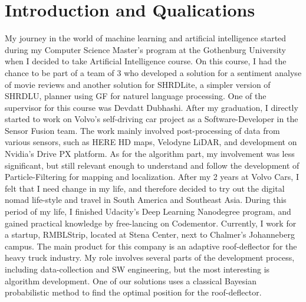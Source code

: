 \documentclass[12pt]{article}
\begin{document}
\maketitle

\begin{abstract}

\end{abstract}

\section*{Introduction and Qualications}
My journey in the world of machine learning and artificial intelligence started during my Computer Science Master's program at the Gothenburg University when I decided to take Artificial Intelligence course. On this course, I had the chance to be part of a team of 3 who developed a solution for a sentiment analyse of movie reviews and another solution for SHRDLite, a simpler version of SHRDLU\cite{win1970shrdlu}, planner using GF for naturel language processing. One of the supervisor for this course was Devdatt Dubhashi.
After my graduation, I directly started to work on Volvo's self-driving car project as a Software-Developer in the Sensor Fusion team. The work mainly involved post-processing of data from various sensors, such as HERE HD maps, Velodyne LiDAR, and development on Nvidia's Drive PX platform. As for the algorithm part, my involvement was less significant, but still relevant enough to understand and follow the development of Particle-Filtering for mapping and localization.
After my 2 years at Volvo Cars, I felt that I need change in my life, and therefore decided to try out the digital nomad life-style and travel in South America and Southeast Asia. During this period of my life, I finished Udacity's Deep Learning Nanodegree program, and gained practical knowledge by free-lancing on Codementor.
Currently, I work for a startup, RMBLStrip, located at Stena Center, next to Chalmer's Johanneberg campus. The main product for this company is an adaptive roof-deflector for the heavy truck industry. My role involves several parts of the development process, including data-collection and SW engineering, but the most interesting is algorithm development. One of our solutions uses a classical Bayesian probabilistic method to find the optimal position for the roof-deflector.
\end{document}
